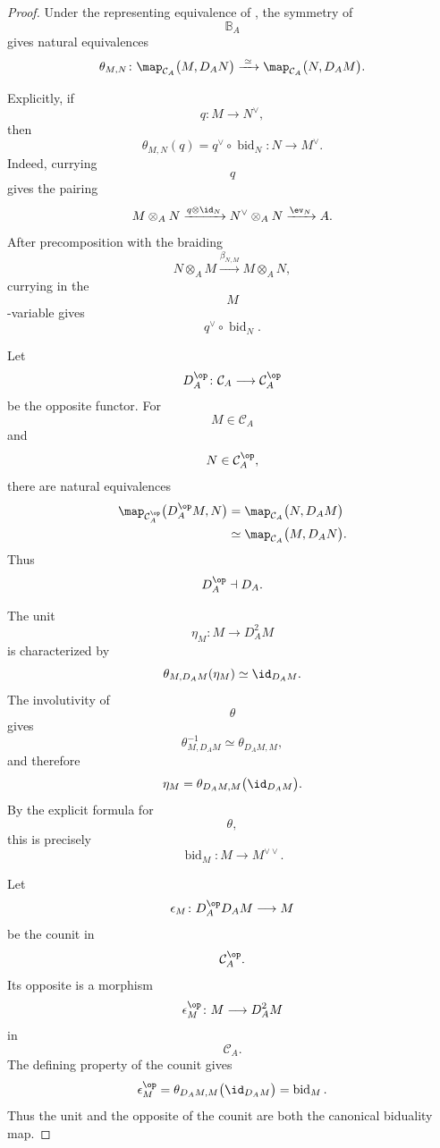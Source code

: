 \begin{proof}
Under the representing equivalence of
,
the symmetry of
\[
    \mathbb B_A
\]
gives natural equivalences
\[
    \theta_{M,N}
    \colon
    \map_{\mathcal C_A}
    \bigl(
        M,
        D_A N
    \bigr)
    \xrightarrow{\;\simeq\;}
    \map_{\mathcal C_A}
    \bigl(
        N,
        D_A M
    \bigr).
\]

Explicitly, if
\[
    q
    \colon
    M
    \longrightarrow
    N^\vee,
\]
then
\[
    \theta_{M,N}(q)
    =
    q^\vee
    \circ
    \operatorname{bid}_N
    \colon
    N
    \longrightarrow
    M^\vee.
\]
Indeed, currying
\[
    q
\]
gives the pairing
\[
    M\otimes_A N
    \xrightarrow{q\otimes\id_N}
    N^\vee\otimes_A N
    \xrightarrow{\ev_N}
    A.
\]
After precomposition with the braiding
\[
    N\otimes_A M
    \xrightarrow{\beta_{N,M}}
    M\otimes_A N,
\]
currying in the
\[
    M
\]
-variable gives
\[
    q^\vee\circ\operatorname{bid}_N.
\]

Let
\[
    D_A^{\op}
    \colon
    \mathcal C_A
    \longrightarrow
    \mathcal C_A^{\op}
\]
be the opposite functor. For
\[
    M\in\mathcal C_A
\]
and
\[
    N\in\mathcal C_A^{\op},
\]
there are natural equivalences
\[
\begin{aligned}
    \map_{\mathcal C_A^{\op}}
    \bigl(
        D_A^{\op}M,
        N
    \bigr)
    &=
    \map_{\mathcal C_A}
    \bigl(
        N,
        D_A M
    \bigr)
    \\
    &\simeq
    \map_{\mathcal C_A}
    \bigl(
        M,
        D_A N
    \bigr).
\end{aligned}
\]
Thus
\[
    D_A^{\op}
    \dashv
    D_A.
\]

The unit
\[
    \eta_M
    \colon
    M
    \longrightarrow
    D_A^2M
\]
is characterized by
\[
    \theta_{M,D_AM}(\eta_M)
    \simeq
    \id_{D_AM}.
\]
The involutivity of
\[
    \theta
\]
gives
\[
    \theta_{M,D_AM}^{-1}
    \simeq
    \theta_{D_AM,M},
\]
and therefore
\[
    \eta_M
    =
    \theta_{D_AM,M}
    \bigl(
        \id_{D_AM}
    \bigr).
\]
By the explicit formula for
\[
    \theta,
\]
this is precisely
\[
    \operatorname{bid}_M
    \colon
    M
    \longrightarrow
    M^{\vee\vee}.
\]

Let
\[
    \epsilon_M
    \colon
    D_A^{\op}D_A M
    \longrightarrow
    M
\]
be the counit in
\[
    \mathcal C_A^{\op}.
\]
Its opposite is a morphism
\[
    \epsilon_M^{\op}
    \colon
    M
    \longrightarrow
    D_A^2M
\]
in
\[
    \mathcal C_A.
\]
The defining property of the counit gives
\[
    \epsilon_M^{\op}
    =
    \theta_{D_AM,M}
    \bigl(
        \id_{D_AM}
    \bigr)
    =
    \operatorname{bid}_M.
\]
Thus the unit and the opposite of the counit are both the canonical
biduality map.


\end{proof}
